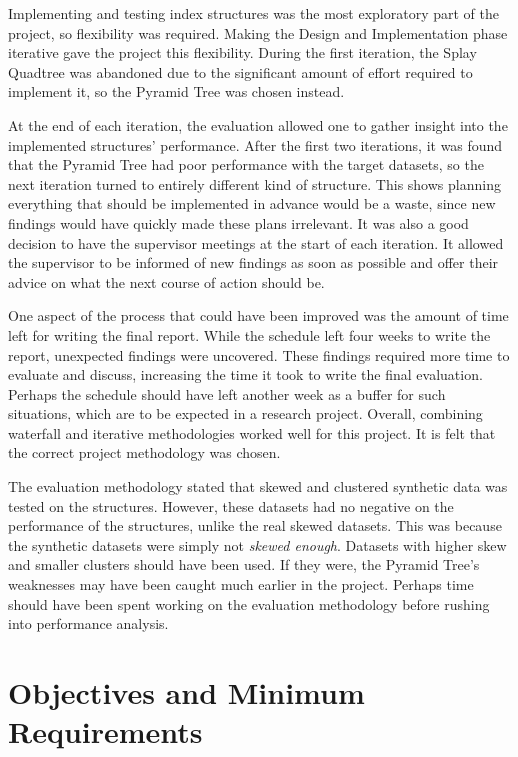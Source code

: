 Implementing and testing index structures was the most exploratory part of the project, so flexibility was required. Making the Design and Implementation phase iterative gave the project this flexibility. During the first iteration, the Splay Quadtree was abandoned due to the significant amount of effort required to implement it, so the Pyramid Tree was chosen instead.

At the end of each iteration, the evaluation allowed one to gather insight into the implemented structures' performance.  After the first two iterations, it was found that the Pyramid Tree had poor performance with the target datasets, so the next iteration turned to entirely different kind of structure. This shows planning everything that should be implemented in advance would be a waste, since new findings would have quickly made these plans irrelevant. It  was also a good decision to have the supervisor meetings at the start of each iteration. It allowed the supervisor to be informed of new findings as soon as possible and offer their advice on what the next course of action should be.

One aspect of the process that could have been improved was the amount of time left for writing the final report. While the schedule left four weeks to write the report, unexpected findings were uncovered. These findings required more time to evaluate and discuss, increasing the time it took to write the final evaluation. Perhaps the schedule should have left another week as a buffer for such situations, which are to be expected in a research project. Overall, combining waterfall and iterative methodologies worked well for this project. It is felt that the correct project methodology was chosen.

The evaluation methodology stated that skewed and clustered synthetic data was tested on the structures. However, these datasets had no negative on the performance of the structures, unlike the real skewed datasets. This was because the synthetic datasets were simply not \textit{skewed enough}. Datasets with higher skew and smaller clusters should have been used. If they were, the Pyramid Tree's weaknesses may have been caught much earlier in the project. Perhaps time should have been spent working on the evaluation methodology before rushing into performance analysis.

\section{Objectives and Minimum Requirements}

